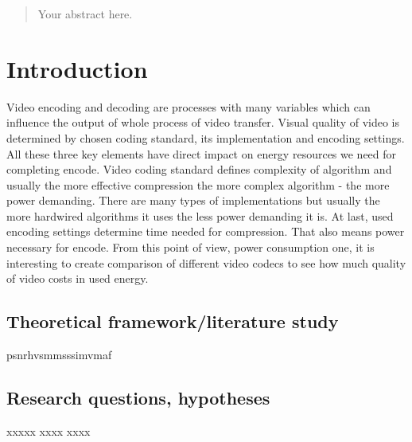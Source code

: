\documentclass[12pt,twoside]{article}
\begin{document}
\maketitle


\begin{abstract}
\label{sec:abstract}

Your abstract here.

\end{abstract}


\tableofcontents
{}
\printglossary[type=\acronymtype]



\clearpage
\section{Introduction}
\label{sect:introduction}
Video encoding and decoding are processes with many variables which can influence the output of whole process of video transfer. Visual quality of video is determined by chosen coding standard, its implementation and encoding settings. All these three key elements have direct impact on energy resources we need for completing encode. Video coding standard defines complexity of algorithm and usually the more effective compression the more complex algorithm - the more power demanding. There are many types of implementations but usually the more hardwired algorithms it uses the less power demanding it is. At last, used encoding settings determine time needed for compression. That also means power necessary for encode. From this point of view, power consumption one, it is interesting to create comparison of different video codecs to see how much quality of video costs in used energy.


\subsection{Theoretical framework/literature study}
\label{sect:framework}
\acrshort{psnrhvsm}\acrshort{msssim}\acrshort{vmaf}


\subsection{Research questions, hypotheses}
\label{sect:questions}
xxxxx xxxx xxxx 
\end{document}
